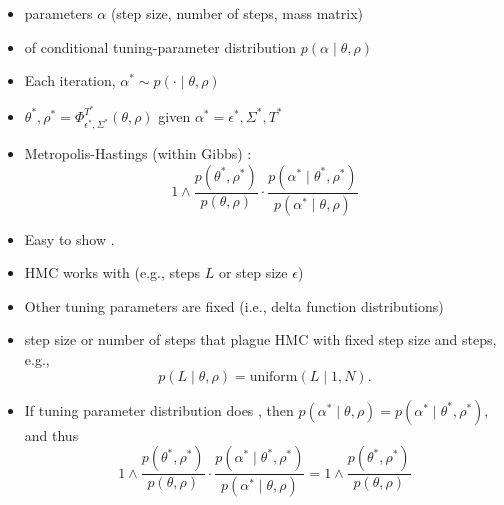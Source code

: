 \documentclass[10pt]{report}
\begin{document}
\begin{itemize}
\item {} parameters $\alpha$ (step
  size, number of steps, mass matrix)
\item {} of conditional tuning-parameter distribution $p(\alpha \mid \theta, \rho)$
\item Each iteration,  $\alpha^* \sim p( \cdot \mid \theta,
  \rho)$
\item {} $\theta^*, \rho^* = \Phi^{T^*}_{\epsilon^*,
    \Sigma^*}(\theta, \rho)$ given $\alpha^* = \epsilon^*,
  \Sigma^*, T^*$
\item Metropolis-Hastings (within Gibbs) :
  $$
  1 \wedge
  \dfrac{p(\theta^*, \rho^*)}
  {p(\theta, \rho)}
  \cdot
  \dfrac{p(\alpha^* \mid \theta^*, \rho^*)}
       {p(\alpha^* \mid \theta, \rho)}
       $$
\item Easy to show .
\end{itemize}

\begin{itemize}
\item HMC works with  (e.g., steps $L$ or
  step size $\epsilon$)
\item Other tuning parameters are fixed (i.e., delta function distributions)
\item {} step size or number of steps  that plague HMC with fixed step size and steps, e.g.,
  $$p(L \mid \theta, \rho) = \textrm{uniform}(L \mid 1, N).$$
\item If tuning parameter distribution does , then $p(\alpha^* \mid \theta, \rho) = p(\alpha^* \mid \theta^*,
  \rho^*)$, and thus
  $$
  1 \wedge
  \dfrac{p(\theta^*, \rho^*)}
       {p(\theta, \rho)}
  \cdot
  \dfrac{p(\alpha^* \mid \theta^*, \rho^*)}
       {p(\alpha^* \mid \theta, \rho)}
       =
       1 \wedge
       \dfrac{p(\theta^*, \rho^*)}{p(\theta, \rho)}
  $$       
\end{itemize}
\end{document}
